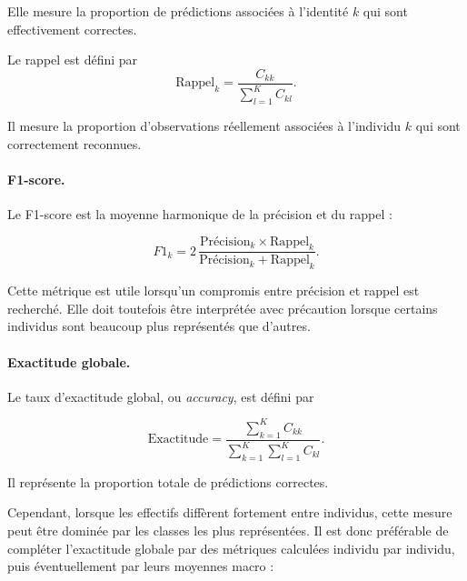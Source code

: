 \documentclass[11pt,a4paper]{report}
\begin{document}
Elle mesure la proportion de prédictions associées à l'identité $k$ qui sont
effectivement correctes.

Le rappel est défini par
\begin{equation}
    \text{Rappel}_k
    =
    \frac{C_{kk}}
    {\displaystyle\sum_{l=1}^{K} C_{kl}}.
    \label{eq:rappel}
\end{equation}

Il mesure la proportion d'observations réellement associées à l'individu $k$
qui sont correctement reconnues.

\paragraph{F1-score.}

Le F1-score est la moyenne harmonique de la précision et du rappel :

\begin{equation}
    F1_k
    =
    2\,
    \frac{
        \text{Précision}_k \times \text{Rappel}_k
    }{
        \text{Précision}_k
        +
        \text{Rappel}_k
    }.
    \label{eq:f1}
\end{equation}

Cette métrique est utile lorsqu'un compromis entre précision et rappel est
recherché. Elle doit toutefois être interprétée avec précaution lorsque
certains individus sont beaucoup plus représentés que d'autres.

\paragraph{Exactitude globale.}

Le taux d'exactitude global, ou \emph{accuracy}, est défini par

\begin{equation}
    \text{Exactitude}
    =
    \frac{
        \displaystyle\sum_{k=1}^{K}C_{kk}
    }{
        \displaystyle\sum_{k=1}^{K}
        \sum_{l=1}^{K}C_{kl}
    }.
    \label{eq:accuracy}
\end{equation}

Il représente la proportion totale de prédictions correctes.

Cependant, lorsque les effectifs diffèrent fortement entre individus, cette
mesure peut être dominée par les classes les plus représentées. Il est donc
préférable de compléter l'exactitude globale par des métriques calculées
individu par individu, puis éventuellement par leurs moyennes macro :
\end{document}
